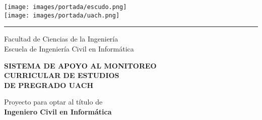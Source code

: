 \documentclass[12pt]{article}
\newcommand{\blockline}{\par\noindent\hspace{-0.05\textwidth}%
    \textcolor{black}{\rule{1.05\textwidth}{0.35mm}}\par\nobreak}
\begin{document}

\thispagestyle{empty}
\setcounter{page}{1}
\begin{spacing}{1.0}

\begin{center}
\texttt{[image: images/portada/escudo.png]}\\
\vspace{0.5cm}
\texttt{[image: images/portada/uach.png]}\\
\vspace{-0.4cm}
\blockline
\vspace{0.2cm}
{\fontsize{24}{24}\selectfont Facultad de Ciencias de la Ingeniería}\\[0.1cm]
{\fontsize{18}{18}\selectfont Escuela de Ingeniería Civil en Informática}\\
\end{center}

\vspace{2.0cm}

\begin{center}
	{\fontsize{18}{18}\selectfont \bf SISTEMA DE APOYO AL MONITOREO}\\[0.2cm]
	{\fontsize{18}{18}\selectfont \bf CURRICULAR DE ESTUDIOS}\\[0.2cm]
	{\fontsize{18}{18}\selectfont \bf DE PREGRADO UACH}\\[0.2cm]   
	
\end{center}

\vspace{2.0cm}

\begin{flushright} \small
{\fontsize{10}{10}\selectfont Proyecto para optar al título de}  \textcolor{white}{.}\\
{\fontsize{10}{10}\selectfont \bf Ingeniero Civil en Informática} 
\end{flushright}

\vspace{1.0cm}


\end{spacing}
\end{document}
